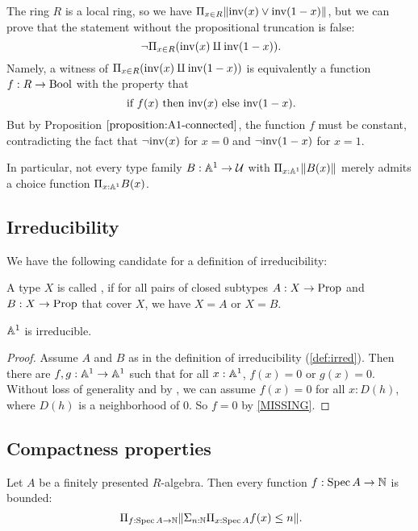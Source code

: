 \begin{example}
  The ring $R$ is a local ring, so we have
  $\Pi_{x \in R} \lVert \mathrm{inv}(x) \lor \mathrm{inv}(1 - x) \rVert$,
  but we can prove that
  the statement without the propositional truncation is false:
  \[ \lnot \Pi_{x \in R} (\inv(x) \amalg \inv(1 - x)) \rlap{.} \]
  Namely,
  a witness of $\Pi_{x \in R} (\mathrm{inv}(x) \amalg \mathrm{inv}(1 - x))$
  is equivalently a function $f : R \to \mathrm{Bool}$
  with the property that
  \[ \text{if $f(x)$ then $\inv(x)$ else $\inv(1 - x)$} \rlap{.} \]
  But by Proposition $\ref{proposition:A1-connected}$,
  the function $f$ must be constant,
  contradicting the fact that
  $\lnot\mathrm{inv}(x)$ for $x = 0$ and $\lnot\mathrm{inv}(1 - x)$ for $x = 1$.

  In particular,
  not every type family $B : \mathbb{A}^1 \to \mathcal{U}$ with $\Pi_{x : \mathbb{A}^1} \lVert B(x) \rVert$
  merely admits a choice function $\Pi_{x : \mathbb{A}^1} B(x)$.
\end{example}

\subsection{Irreducibility}
We have the following candidate for a definition of irreducibility:

\begin{definition}%
  \label{def:irred}
  A type $X$ is called ,
  if for all pairs of closed subtypes $A:X\to \mathrm{Prop}$ and $B:X\to\mathrm{Prop}$ that cover $X$,
  we have $X=A$ or $X=B$.
\end{definition}

\begin{proposition}%
  $\mathbb{A}^1$ is irreducible.
\end{proposition}
\begin{proof}
  Assume $A$ and $B$ as in the definition of irreducibility (\cref{def:irred}).
  Then there are $f,g:\mathbb{A}^1\to\mathbb{A}^1$ such that for all $x:\mathbb{A}^1$, $f(x)=0$ or $g(x)=0$.
  Without loss of generality and by , we can assume $f(x)=0$ for all $x:D(h)$,
  where $D(h)$ is a neighborhood of $0$.
  So $f=0$ by \cref{MISSING}.
\end{proof}

\subsection{Compactness properties}

\begin{theorem}%
  \label{thm:boundedness}
  Let $A$ be a finitely presented $R$-algebra.
  Then every function $f : \operatorname{Spec} A \to \mathbb{N}$ is bounded:
  \[ \Pi_{f : \Spec A \to \N} \propTrunc{\Sigma_{n : \N} \Pi_{x : \Spec A} f(x) \le n}
     \rlap{.} \]
\end{theorem}

